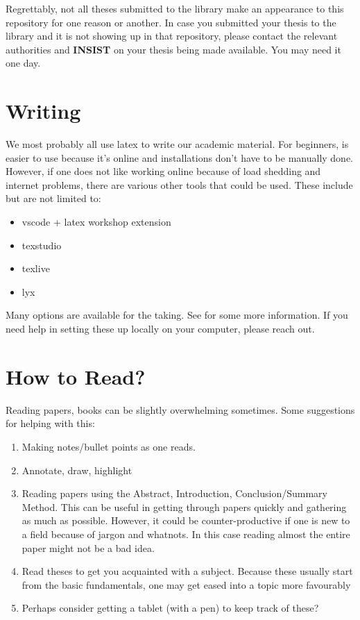    Regrettably, not all theses submitted to the library make an appearance to this repository for one reason or another. In case you submitted your thesis to the library and it is not showing up in that repository, please contact the relevant authorities and \textbf{INSIST} on your thesis being made available. You may need it one day.


\section{Writing}
    We most probably all use latex to write our academic material. For beginners,  is easier to use because it's online and installations don't have to be manually done. However, if one does not like working online because of load shedding and internet problems, there are various other tools that could be used. These include but are not limited to: 

    \begin{itemize}
        \item vscode + latex workshop extension
        \item texstudio
        \item texlive
        \item lyx
    \end{itemize}

    Many options are available for the taking. See  for some more information. If you need help in setting these up locally on your computer, please reach out. 



\section{How to Read?}
    Reading papers, books can be slightly overwhelming sometimes. Some suggestions for helping with
    this:
    \begin{enumerate}
        \item Making notes/bullet points as one reads.
        \item Annotate, draw, highlight
        \item Reading papers using the Abstract, Introduction, Conclusion/Summary Method. This can be useful in getting through papers quickly and gathering as much as possible. However, it could be counter-productive if one is new to a field because of jargon and whatnots. In this case reading almost the entire paper might not be a bad idea.
        \item Read theses to get you acquainted with a subject. Because these usually start from the basic fundamentals, one may get eased into a topic more favourably
        \item Perhaps consider getting a tablet (with a pen) to keep track of these?
    \end{enumerate}

